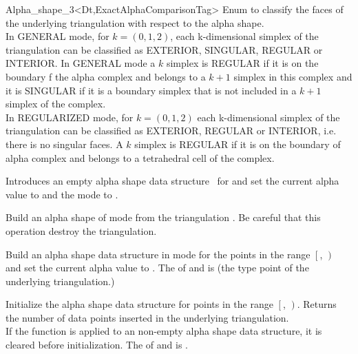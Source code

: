\begin{ccRefClass} {Alpha_shape_3<Dt,ExactAlphaComparisonTag>}
{Enum to classify the faces of the underlying 
triangulation with respect to the alpha shape. \\ 
In GENERAL mode, for $k=(0,1,2)$,
 each k-dimensional simplex of the triangulation
can be classified as EXTERIOR, SINGULAR, REGULAR
or INTERIOR.
In GENERAL mode a $k$ simplex is REGULAR if it is on the boundary
f the alpha complex and belongs to a $k+1$ simplex in this complex
and it is SINGULAR  if it is  a boundary simplex that is not included in a $k+1$ simplex of the complex. \\  
In REGULARIZED mode, for $k=(0,1,2)$
each k-dimensional simplex of the triangulation
can be classified as EXTERIOR, REGULAR or INTERIOR, i.e.
there is no singular faces.
A $k$ simplex is REGULAR if it is on the boundary of alpha complex
and belongs to a tetrahedral cell of the complex.}




\ccCreation
{}

{Introduces an empty alpha shape data structure
\ccVar\ for and set the
current alpha value to  and the mode to .}

{Build an alpha shape of mode  
from the triangulation . 
Be careful that this operation destroy the triangulation.}

{Build an alpha shape data structure in mode  
for the points in the range
$\left[\right.$, $\left.\right)$ and 
set the current alpha value to .
\ccPrecond The  of  and
 is  (the type point of the underlying 
triangulation.)}


\ccModifiers

{Initialize the alpha shape data structure
for  points in the range
$\left[\right.$, $\left.\right)$. 
Returns the number of data points inserted in the underlying
triangulation. \\ 
If the function is applied to an non-empty alpha shape data structure, it is cleared
before initialization.
\ccPrecond The  of  and
 is .}


\end{ccRefClass}
